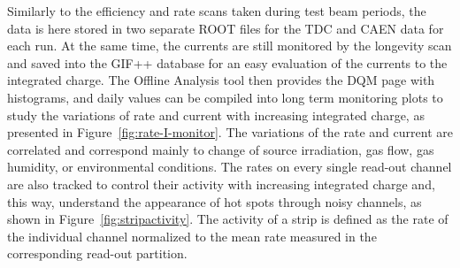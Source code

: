 	Similarly to the efficiency and rate scans taken during test beam periods, the data is here stored in two separate ROOT files for the TDC and CAEN data for each run. At the same time, the currents are still monitored by the longevity scan and saved into the GIF++ database for an easy evaluation of the currents to the integrated charge. The Offline Analysis tool then provides the DQM page with histograms, and daily values can be compiled into long term monitoring plots to study the variations of rate and current with increasing integrated charge, as presented in Figure~\ref{fig:rate-I-monitor}. The variations of the rate and current are correlated and correspond mainly to change of source irradiation, gas flow, gas humidity, or environmental conditions. The rates on every single read-out channel are also tracked to control their activity with increasing integrated charge and, this way, understand the appearance of hot spots through noisy channels, as shown in Figure~\ref{fig:stripactivity}. The activity of a strip is defined as the rate of the individual channel normalized to the mean rate measured in the corresponding read-out partition.

